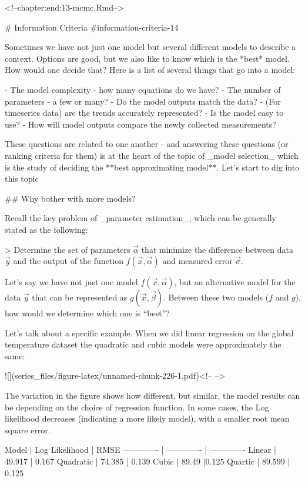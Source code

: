 \documentclass[
]{book}
\theoremstyle{definition}
\theoremstyle{definition}
\theoremstyle{definition}
\theoremstyle{remark}
\begin{document}
<!--chapter:end:13-mcmc.Rmd-->

# Information Criteria {#information-criteria-14}



Sometimes we have not just one model but several different models to describe a context.  Options are good, but we also like to know which is the *best* model.  How would one decide that?  Here is a list of several things that go into a model:

- The model complexity - how many equations do we have?
- The number of parameters - a few or many?
- Do the model outputs match the data?
- (For timeseries data) are the trends accurately represented?
- Is the model easy to use?
- How will model outputs compare the newly collected measurements?

These questions are related to one another - and answering these questions (or ranking criteria for them) is at the heart of the topic of _model selection_ which is the study of deciding the **best approximating model**.  Let's start to dig into this topic

## Why bother with more models?

Recall the key problem of _parameter estimation_, which can be generally stated as the following:

> Determine the set of parameters $\vec{\alpha}$ that minimize the difference between data $\vec{y}$ and the output of the function $f(\vec{x}, \vec{\alpha})$ and measured error $\vec{\sigma}$.


Let's say we have not just one model $f(\vec{x}, \vec{\alpha})$, but an alternative model for the data $\vec{y}$ that can be represented as $g(\vec{x}, \vec{\beta})$.  Between these two models ($f$ and $g$), how would we determine which one is ``best''?

Let's talk about a specific example.  When we did linear regression on the global temperature dataset the quadratic and cubic models were approximately the same:

![](series_files/figure-latex/unnamed-chunk-226-1.pdf)<!-- --> 

The variation in the figure shows how different, but similar, the model results can be depending on the choice of regression function.  In some cases, the Log likelihood decreases (indicating a more likely model), with a smaller root mean square error.

Model  | Log Likelihood | RMSE
------------- | ------------- | -------------
Linear    | 49.917 | 0.167
Quadratic    | 74.385 | 0.139
Cubic        | 89.49 |0.125
Quartic        | 89.599 | 0.125
\end{document}
